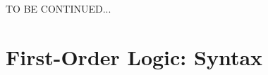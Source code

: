 \documentclass[a4paper, 11pt]{article} %
\begin{document}






\pagebreak
\noindent
TO BE CONTINUED...
\pagebreak





\section*{\sc First-Order Logic: Syntax}
\end{document}
